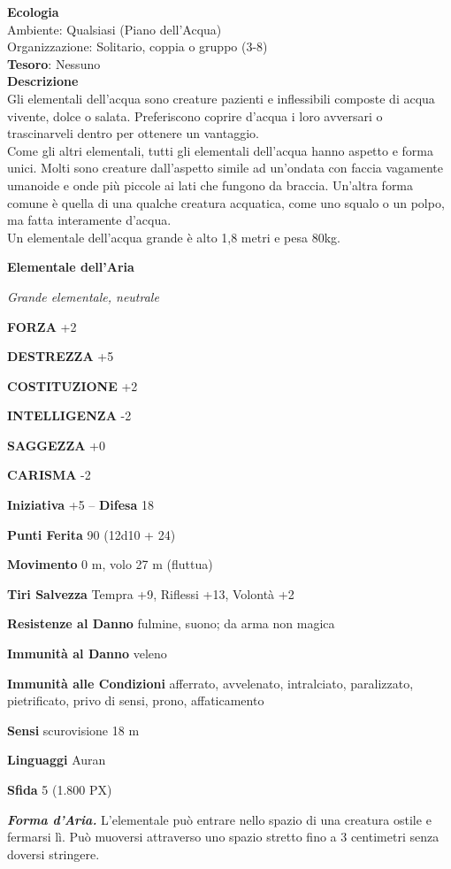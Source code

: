 \begin{multicols}{2}
\textbf{Ecologia}\\
Ambiente: Qualsiasi (Piano dell'Acqua)\\
Organizzazione: Solitario, coppia o gruppo (3-8)\\
\textbf{Tesoro}: Nessuno\\
\textbf{Descrizione}\\
Gli elementali dell'acqua sono creature pazienti e inflessibili composte di acqua vivente, dolce o salata. Preferiscono coprire d'acqua i loro avversari o trascinarveli dentro per ottenere un vantaggio.\\
Come gli altri elementali, tutti gli elementali dell'acqua hanno aspetto e forma unici. Molti sono creature dall'aspetto simile ad un'ondata con faccia vagamente umanoide e onde più piccole ai lati che fungono da braccia. Un'altra forma comune è quella di una qualche creatura acquatica, come uno squalo o un polpo, ma fatta interamente d'acqua.\\
Un elementale dell'acqua grande è alto 1,8 metri e pesa 80kg.

\medskip{}\textbf{Elementale dell'Aria}

\textit{Grande elementale, neutrale}

\textbf{FORZA} +2

\textbf{DESTREZZA} +5

\textbf{COSTITUZIONE} +2

\textbf{INTELLIGENZA} -2

\textbf{SAGGEZZA} +0

\textbf{CARISMA} -2

\textbf{Iniziativa} +5 -- \textbf{Difesa} 18

\textbf{Punti Ferita} 90 (12d10 + 24)

\textbf{Movimento} 0 m, volo 27 m (fluttua)

\textbf{Tiri Salvezza} Tempra +9, Riflessi +13, Volontà +2

\textbf{Resistenze al Danno} fulmine, suono; da arma non magica

\textbf{Immunità al Danno} veleno

\textbf{Immunità alle Condizioni} afferrato, avvelenato, intralciato, paralizzato, pietrificato, privo di sensi, prono, affaticamento

\textbf{Sensi} scurovisione 18 m

\textbf{Linguaggi} Auran

\textbf{Sfida} 5 (1.800 PX)

\textit{\textbf{Forma d'Aria.}} L'elementale può entrare nello spazio di una creatura ostile e fermarsi lì. Può muoversi attraverso uno spazio stretto fino a 3 centimetri senza doversi stringere.


\end{multicols}
